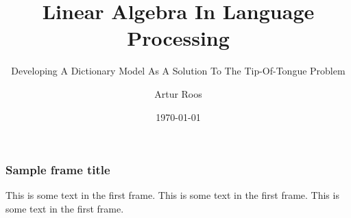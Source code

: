\documentclass{beamer}
\title{Linear Algebra In Language Processing}
\subtitle{Developing A Dictionary Model As A Solution To The Tip-Of-Tongue Problem}
\author{Artur Roos}
\institute{Joensuun Lyseon Lukio}
\date{\today}
\begin{document}
\frame{\titlepage}

\begin{frame}
\frametitle{Sample frame title}
This is some text in the first frame. This is some text in the first frame. This is some text in the first frame.
\end{frame}
\end{document}
